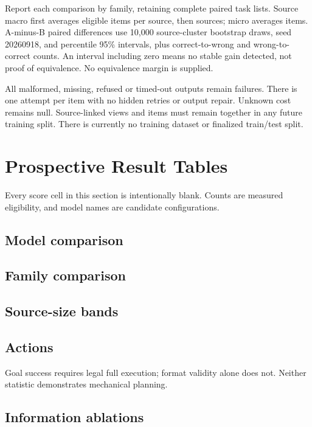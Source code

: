 \documentclass[10pt,letterpaper]{article}
\begin{document}
Report each comparison by family, retaining complete paired task lists.
Source macro first averages eligible items per source, then sources;
micro averages items. A-minus-B paired differences use 10,000
source-cluster bootstrap draws, seed 20260918, and percentile 95\%
intervals, plus correct-to-wrong and wrong-to-correct counts.
An interval including zero means no stable gain detected, not proof
of equivalence. No equivalence margin is supplied.

All malformed, missing, refused or timed-out outputs remain failures.
There is one attempt per item with no hidden retries or output repair.
Unknown cost remains null. Source-linked views and items must remain
together in any future training split. There is currently no training
dataset or finalized train/test split.

\clearpage\section{Prospective Result Tables}
Every score cell in this section is intentionally blank. Counts are
measured eligibility, and model names are candidate configurations.
\subsection{Model comparison}
\begin{center}\small\end{center}
\subsection{Family comparison}
\begin{center}\small\end{center}
\subsection{Source-size bands}
\begin{center}\small\end{center}
\subsection{Actions}
\begin{center}\small\end{center}
Goal success requires legal full execution; format validity alone
does not. Neither statistic demonstrates mechanical planning.
\clearpage\subsection{Information ablations}
\begin{center}\small\end{center}
\end{document}

